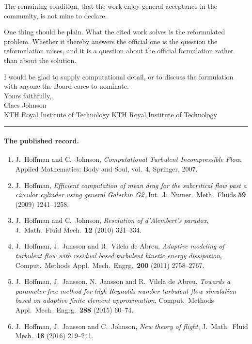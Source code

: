 \documentclass[11pt]{article}
\begin{document}
The remaining condition, that the work enjoy general acceptance in the community, is not mine to
declare.

One thing should be plain. What the cited work solves is the reformulated problem. Whether it thereby
answers the official one is the question the reformulation raises, and it is a question about the
official formulation rather than about the solution.

I would be glad to supply computational detail, or to discuss the formulation with anyone the Board
cares to nominate.\\[1.4em]

\noindent Yours faithfully,\\[2.2em]

\noindent Claes Johnson\\
\noindent KTH Royal Institute of Technology \hfill KTH Royal Institute of Technology

\vspace{2em}
\noindent\rule{\textwidth}{0.4pt}

\paragraph{The published record.}
\begin{enumerate}\itemsep2pt
\item J.~Hoffman and C.~Johnson, \emph{Computational Turbulent Incompressible Flow}, Applied
  Mathematics: Body and Soul, vol.~4, Springer, 2007.
\item J.~Hoffman, \emph{Efficient computation of mean drag for the subcritical flow past a circular
  cylinder using general Galerkin G2}, Int.\ J.\ Numer.\ Meth.\ Fluids \textbf{59} (2009) 1241--1258.
\item J.~Hoffman and C.~Johnson, \emph{Resolution of d'Alembert's paradox}, J.\ Math.\ Fluid Mech.\
  \textbf{12} (2010) 321--334.
\item J.~Hoffman, J.~Jansson and R.~Vilela de Abreu, \emph{Adaptive modeling of turbulent flow with
  residual based turbulent kinetic energy dissipation}, Comput.\ Methods Appl.\ Mech.\ Engrg.\
  \textbf{200} (2011) 2758--2767.
\item J.~Hoffman, J.~Jansson, N.~Jansson and R.~Vilela de Abreu, \emph{Towards a parameter-free method
  for high Reynolds number turbulent flow simulation based on adaptive finite element approximation},
  Comput.\ Methods Appl.\ Mech.\ Engrg.\ \textbf{288} (2015) 60--74.
\item J.~Hoffman, J.~Jansson and C.~Johnson, \emph{New theory of flight}, J.\ Math.\ Fluid Mech.\
  \textbf{18} (2016) 219--241.
\end{enumerate}
\end{document}
